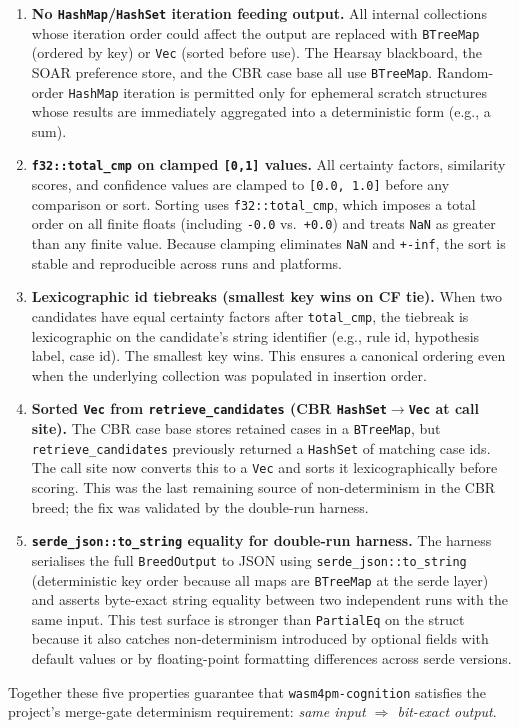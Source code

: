 \begin{enumerate}

\item \textbf{No \texttt{HashMap}/\texttt{HashSet} iteration feeding output.}
All internal collections whose iteration order could affect the output are
replaced with \texttt{BTreeMap} (ordered by key) or \texttt{Vec} (sorted
before use).  The Hearsay blackboard, the SOAR preference store, and the
CBR case base all use \texttt{BTreeMap}.  Random-order \texttt{HashMap}
iteration is permitted only for ephemeral scratch structures whose results
are immediately aggregated into a deterministic form (e.g., a sum).

\item \textbf{\texttt{f32::total\_cmp} on clamped \texttt{[0,1]} values.}
All certainty factors, similarity scores, and confidence values are clamped
to \texttt{[0.0,\ 1.0]} before any comparison or sort.  Sorting uses
\texttt{f32::total\_cmp}, which imposes a total order on all finite floats
(including \texttt{-0.0} vs.\ \texttt{+0.0}) and treats \texttt{NaN} as
greater than any finite value.  Because clamping eliminates \texttt{NaN}
and \texttt{+-inf}, the sort is stable and reproducible across runs and
platforms.

\item \textbf{Lexicographic id tiebreaks (smallest key wins on CF tie).}
When two candidates have equal certainty factors after \texttt{total\_cmp},
the tiebreak is lexicographic on the candidate's string identifier
(e.g., rule id, hypothesis label, case id).  The smallest key wins.
This ensures a canonical ordering even when the underlying collection was
populated in insertion order.

\item \textbf{Sorted \texttt{Vec} from \texttt{retrieve\_candidates} (CBR
\texttt{HashSet}$\to$\texttt{Vec} at call site).}
The CBR case base stores retained cases in a \texttt{BTreeMap}, but
\texttt{retrieve\_candidates} previously returned a \texttt{HashSet} of
matching case ids.  The call site now converts this to a \texttt{Vec} and
sorts it lexicographically before scoring.  This was the last remaining
source of non-determinism in the CBR breed; the fix was validated by the
double-run harness.

\item \textbf{\texttt{serde\_json::to\_string} equality for double-run harness.}
The harness serialises the full \texttt{BreedOutput} to JSON using
\texttt{serde\_json::to\_string} (deterministic key order because all maps
are \texttt{BTreeMap} at the serde layer) and asserts byte-exact string
equality between two independent runs with the same input.  This test
surface is stronger than \texttt{PartialEq} on the struct because it also
catches non-determinism introduced by optional fields with default values
or by floating-point formatting differences across serde versions.

\end{enumerate}

\noindent
Together these five properties guarantee that \texttt{wasm4pm-cognition}
satisfies the project's merge-gate determinism requirement:
\emph{same input $\Rightarrow$ bit-exact output}.
